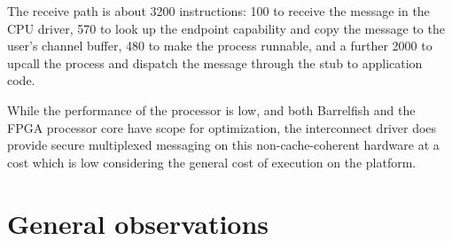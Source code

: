 \documentclass[a4paper,twoside]{report} %
\begin{document}
The receive path is about 3200 instructions: 100
to receive the message in the CPU driver, 570 to look up the endpoint
capability and copy the message to the user's channel buffer, 480 to
make the process runnable, and a further 2000 to upcall the process
and dispatch the message through the stub to application code.

While the performance of the processor is low, and both Barrelfish
and the FPGA processor core have scope for optimization,
the interconnect driver does provide secure multiplexed
messaging on this non-cache-coherent hardware at a cost which is low
considering the general cost of execution on the platform.



\chapter{General observations}
\end{document}
